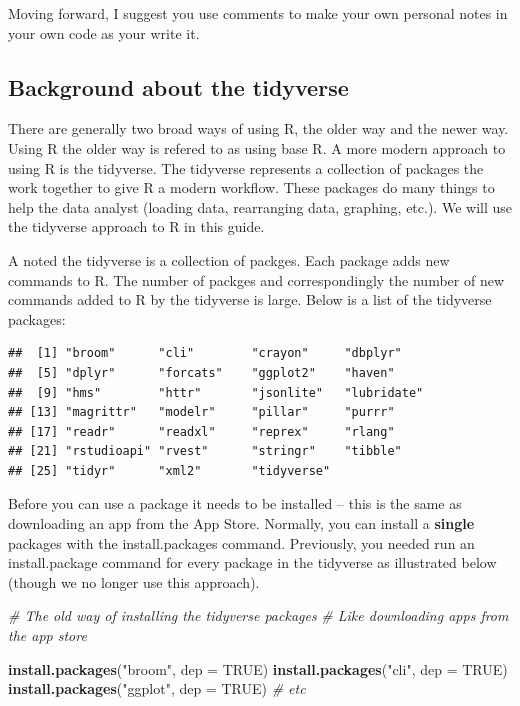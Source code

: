 \documentclass[
]{krantz}
\makeatletter
\newenvironment{Shaded}{\begin{snugshade}}{\end{snugshade}}
\newcommand{\CommentTok}[1]{\textcolor[rgb]{0.37,0.37,0.37}{\textit{#1}}}
\newcommand{\DataTypeTok}[1]{\textcolor[rgb]{0.27,0.27,0.27}{#1}}
\newcommand{\KeywordTok}[1]{\textcolor[rgb]{0.27,0.27,0.27}{\textbf{#1}}}
\newcommand{\NormalTok}[1]{#1}
\newcommand{\OtherTok}[1]{\textcolor[rgb]{0.37,0.37,0.37}{#1}}
\newcommand{\StringTok}[1]{\textcolor[rgb]{0.5,0.5,0.5}{#1}}
\newenvironment{kframe}{%
\medskip{}
\setlength{\fboxsep}{.8em}
 \def\at@end@of@kframe{}%
 \ifinner\ifhmode%
  \def\at@end@of@kframe{\end{minipage}}%
  \begin{minipage}{\columnwidth}%
 \fi\fi%
 \def\FrameCommand##1{\hskip\@totalleftmargin \hskip-\fboxsep
 \colorbox{shadecolor}{##1}\hskip-\fboxsep
     \hskip-\linewidth \hskip-\@totalleftmargin \hskip\columnwidth}%
 \MakeFramed {\advance\hsize-\width
   \@totalleftmargin\z@ \linewidth\hsize
   \@setminipage}}%
 {\par\unskip\endMakeFramed%
 \at@end@of@kframe}
\renewenvironment{Shaded}{\begin{kframe}}{\end{kframe}}
\makeatother
\begin{document}
Moving forward, I suggest you use comments to make your own personal notes in your own code as your write it.

\hypertarget{background-about-the-tidyverse}{%
\subsection{Background about the tidyverse}\label{background-about-the-tidyverse}}

There are generally two broad ways of using R, the older way and the newer way. Using R the older way is refered to as using base R. A more modern approach to using R is the tidyverse. The tidyverse represents a collection of packages the work together to give R a modern workflow. These packages do many things to help the data analyst (loading data, rearranging data, graphing, etc.). We will use the tidyverse approach to R in this guide.

A noted the tidyverse is a collection of packges. Each package adds new commands to R. The number of packges and correspondingly the number of new commands added to R by the tidyverse is large. Below is a list of the tidyverse packages:

\begin{verbatim}
##  [1] "broom"      "cli"        "crayon"     "dbplyr"    
##  [5] "dplyr"      "forcats"    "ggplot2"    "haven"     
##  [9] "hms"        "httr"       "jsonlite"   "lubridate" 
## [13] "magrittr"   "modelr"     "pillar"     "purrr"     
## [17] "readr"      "readxl"     "reprex"     "rlang"     
## [21] "rstudioapi" "rvest"      "stringr"    "tibble"    
## [25] "tidyr"      "xml2"       "tidyverse"
\end{verbatim}

Before you can use a package it needs to be installed -- this is the same as downloading an app from the App Store. Normally, you can install a \textbf{single} packages with the install.packages command. Previously, you needed run an install.package command for every package in the tidyverse as illustrated below (though we no longer use this approach).

\begin{Shaded}
\begin{Highlighting}[]
\CommentTok{# The old way of installing the tidyverse packages}
\CommentTok{# Like downloading apps from the app store}

\KeywordTok{install.packages}\NormalTok{(}\StringTok{"broom"}\NormalTok{, }\DataTypeTok{dep =} \OtherTok{TRUE}\NormalTok{)}
\KeywordTok{install.packages}\NormalTok{(}\StringTok{"cli"}\NormalTok{, }\DataTypeTok{dep =} \OtherTok{TRUE}\NormalTok{)}
\KeywordTok{install.packages}\NormalTok{(}\StringTok{"ggplot"}\NormalTok{, }\DataTypeTok{dep =} \OtherTok{TRUE}\NormalTok{)}
\CommentTok{# etc}
\end{Highlighting}
\end{Shaded}
\end{document}
